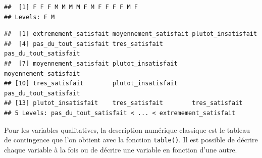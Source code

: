 \documentclass[
]{book}
\newenvironment{Shaded}{\begin{snugshade}}{\end{snugshade}}
\newcommand{\AttributeTok}[1]{\textcolor[rgb]{0.13,0.29,0.53}{#1}}
\newcommand{\ConstantTok}[1]{\textcolor[rgb]{0.56,0.35,0.01}{#1}}
\newcommand{\FunctionTok}[1]{\textcolor[rgb]{0.13,0.29,0.53}{\textbf{#1}}}
\newcommand{\NormalTok}[1]{#1}
\newcommand{\OtherTok}[1]{\textcolor[rgb]{0.56,0.35,0.01}{#1}}
\newcommand{\SpecialCharTok}[1]{\textcolor[rgb]{0.81,0.36,0.00}{\textbf{#1}}}
\newcommand{\StringTok}[1]{\textcolor[rgb]{0.31,0.60,0.02}{#1}}
\begin{document}
\begin{Shaded}
\end{Shaded}

\begin{verbatim}
##  [1] F F F M M M M F M F F F F M F
## Levels: F M
\end{verbatim}

\begin{Shaded}
\end{Shaded}

\begin{verbatim}
##  [1] extremement_satisfait moyennement_satisfait plutot_insatisfait   
##  [4] pas_du_tout_satisfait tres_satisfait        pas_du_tout_satisfait
##  [7] moyennement_satisfait plutot_insatisfait    moyennement_satisfait
## [10] tres_satisfait        plutot_insatisfait    pas_du_tout_satisfait
## [13] plutot_insatisfait    tres_satisfait        tres_satisfait       
## 5 Levels: pas_du_tout_satisfait < ... < extremement_satisfait
\end{verbatim}

Pour les variables qualitatives, la description numérique classique est le tableau de contingence que l'on obtient avec la fonction \texttt{table()}. Il est possible de décrire chaque variable à la fois ou de décrire une variable en fonction d'une autre.

\begin{Shaded}
\end{Shaded}
\end{document}
